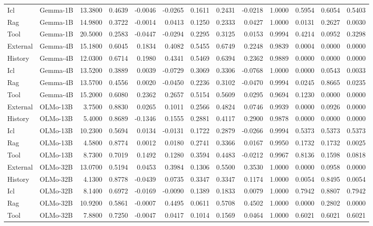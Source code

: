 \begin{tabular}{llrrrrrrrrrrr}
Icl & Gemma-1B & 13.3800 & 0.4639 & -0.0046 & -0.0265 & 0.1611 & 0.2431 & -0.0218 & 1.0000 & 0.5954 & 0.6054 & 0.5403 \\
Rag & Gemma-1B & 14.9800 & 0.3722 & -0.0014 & 0.0413 & 0.1250 & 0.2333 & 0.0427 & 1.0000 & 0.0131 & 0.2627 & 0.0030 \\
Tool & Gemma-1B & 20.5000 & 0.2583 & -0.0447 & -0.0294 & 0.2295 & 0.3125 & 0.0153 & 0.9994 & 0.4214 & 0.0952 & 0.3298 \\
External & Gemma-4B & 15.1800 & 0.6045 & 0.1834 & 0.4082 & 0.5455 & 0.6749 & 0.2248 & 0.9839 & 0.0004 & 0.0000 & 0.0000 \\
History & Gemma-4B & 12.0300 & 0.6714 & 0.1980 & 0.4341 & 0.5469 & 0.6394 & 0.2362 & 0.9889 & 0.0000 & 0.0000 & 0.0000 \\
Icl & Gemma-4B & 13.5200 & 0.3889 & 0.0039 & -0.0729 & 0.3069 & 0.3306 & -0.0768 & 1.0000 & 0.0000 & 0.0543 & 0.0033 \\
Rag & Gemma-4B & 13.5700 & 0.4556 & 0.0020 & -0.0450 & 0.2236 & 0.3102 & -0.0470 & 0.9994 & 0.0245 & 0.8665 & 0.0235 \\
Tool & Gemma-4B & 15.2000 & 0.6080 & 0.2362 & 0.2657 & 0.5154 & 0.5609 & 0.0295 & 0.9694 & 0.1230 & 0.0000 & 0.0000 \\
External & OLMo-13B & 3.7500 & 0.8830 & 0.0265 & 0.1011 & 0.2566 & 0.4824 & 0.0746 & 0.9939 & 0.0000 & 0.0926 & 0.0000 \\
History & OLMo-13B & 5.4000 & 0.8689 & -0.1346 & 0.1555 & 0.2881 & 0.4117 & 0.2900 & 0.9878 & 0.0000 & 0.0000 & 0.0000 \\
Icl & OLMo-13B & 10.2300 & 0.5694 & 0.0134 & -0.0131 & 0.1722 & 0.2879 & -0.0266 & 0.9994 & 0.5373 & 0.5373 & 0.5373 \\
Rag & OLMo-13B & 4.5800 & 0.8774 & 0.0012 & 0.0180 & 0.2741 & 0.3366 & 0.0167 & 0.9950 & 0.1732 & 0.1732 & 0.0025 \\
Tool & OLMo-13B & 8.7300 & 0.7019 & 0.1492 & 0.1280 & 0.3594 & 0.4483 & -0.0212 & 0.9967 & 0.8136 & 0.1598 & 0.0818 \\
External & OLMo-32B & 13.0700 & 0.5194 & 0.0453 & 0.3984 & 0.1306 & 0.5500 & 0.3530 & 1.0000 & 0.0000 & 0.0958 & 0.0000 \\
History & OLMo-32B & 4.1300 & 0.8778 & -0.0439 & 0.0735 & 0.3347 & 0.3347 & 0.1174 & 1.0000 & 0.0054 & 0.8495 & 0.0054 \\
Icl & OLMo-32B & 8.1400 & 0.6972 & -0.0169 & -0.0090 & 0.1389 & 0.1833 & 0.0079 & 1.0000 & 0.7942 & 0.8807 & 0.7942 \\
Rag & OLMo-32B & 10.9200 & 0.5861 & -0.0007 & 0.4495 & 0.0611 & 0.5708 & 0.4502 & 1.0000 & 0.0000 & 0.2802 & 0.0000 \\
Tool & OLMo-32B & 7.8800 & 0.7250 & -0.0047 & 0.0417 & 0.1014 & 0.1569 & 0.0464 & 1.0000 & 0.6021 & 0.6021 & 0.6021 \\
\bottomrule
\end{tabular}
